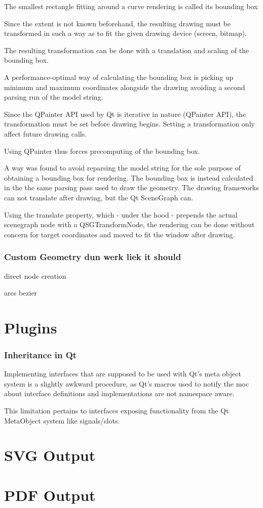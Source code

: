 The smallest rectangle fitting around a curve rendering is called its  \gls{bounding box}

Since the extent is not known beforehand, the resulting drawing must be transformed in such a way as to fit the given drawing device (screen, bitmap).

The resulting transformation can be done with a translation and scaling of the bounding box.

A performance-optimal way of calculating the bounding box is picking up minimum and maximum coordinates alongside the drawing avoiding a second parsing run of the model string.

Since the \gls{QPainter} API used by Qt is iterative in nature (\gls{QPainter} API), the transformation must be set before drawing begins. Setting a transformation only affect future drawing calls.

Using \gls{QPainter} thus forces precomputing of the bounding box.


A way was found to avoid reparsing the model string for the sole purpose of obtaining a bounding box for rendering.
The bounding box is instead calculated in the the same parsing pass used to draw the geometry. The drawing frameworks can not translate after drawing, but the Qt SceneGraph can.

Using the translate property, which - under the hood - prepends the actual scenegraph node with a QSGTransformNode, the rendering can be done without concern for target coordinates and moved to fit the window after drawing.
\subsubsection{Custom Geometry dun werk liek it should}
direct node creation

\label{sec:implrenderprob}
arcs bezier

\section{Plugins}
\subsubsection{Inheritance in Qt}
Implementing interfaces that are supposed to be used with Qt's meta object system is a slightly awkward procedure, as Qt's macros used to notify the moc about interface definitions and implementations are not namespace aware. 

This limitation pertains to interfaces exposing functionality from the Qt MetaObject system like signals/slots.

\section{SVG Output}
\label{sec:svg}

\section{PDF Output}
\label{sec:pdf}


